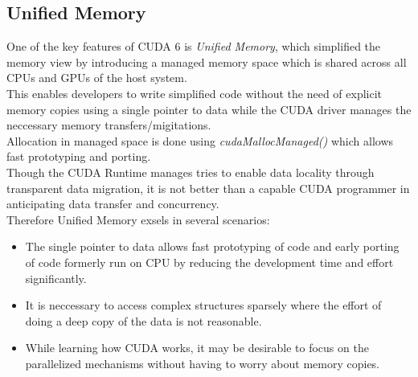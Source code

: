 \subsection{Unified Memory}
\cite{parallel_for_all_unified_memory, }
\label{unified_memory}
One of the key features of CUDA 6 is \emph{Unified Memory}, which simplified the memory view by introducing a managed memory space which is shared
across all CPUs and GPUs of the host system.\\
This enables developers to write simplified code without the need of explicit memory copies using a single pointer to data
while the CUDA driver manages the neccessary memory transfers/migitations.\\
Allocation in managed space is done using \emph{cudaMallocManaged()} which allows fast prototyping and porting.\\
Though the CUDA Runtime manages tries to enable data locality through transparent data migration,
it is not better than a capable CUDA programmer in anticipating data transfer and concurrency.\\
Therefore Unified Memory exsels in several scenarios:\\
\begin{itemize}
        \item The single pointer to data allows fast prototyping of code and early porting of code formerly run on CPU by reducing the development time and effort significantly.
        \item It is neccessary to access complex structures sparsely where the effort of doing a deep copy of the data is not reasonable.
        \item While learning how CUDA works, it may be desirable to focus on the parallelized mechanisms without having to worry about memory copies.
\end{itemize}
